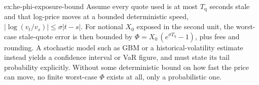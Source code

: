 \documentclass[11pt,a4paper]{article}
\theoremstyle{definition}
\theoremstyle{definition}
\theoremstyle{remark}
\begin{document}
\begin{pdsolution}{ex:he-phi-exposure-bound}
Assume every quote used is at most $T_{\mathrm q}$ seconds stale and that log-price
moves at a bounded deterministic speed, $|\log(v_t/v_s)|\le\sigma|t-s|$. For
notional $X_0$ exposed in the second unit, the worst-case stale-quote error is then
bounded by $\Phi = X_0\,(e^{\sigma T_{\mathrm q}}-1)$, plus fees and rounding. A stochastic
model such as GBM or a historical-volatility estimate instead yields a
confidence interval or VaR figure, and must state its tail probability
explicitly. Without some deterministic bound on how fast the price can move,
no finite worst-case $\Phi$ exists at all, only a probabilistic one.
\end{pdsolution}

\end{document}
